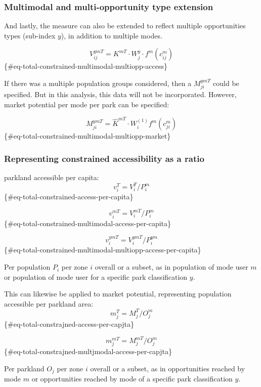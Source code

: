 \documentclass[
11pt, %
oneside, %
english, %
singlespacing, %
]{macthesis} %
\begin{document}
\subsubsection{Multimodal and multi-opportunity type extension}\label{multimodal-and-multi-opportunity-type-extension}

And lastly, the measure can also be extended to reflect multiple opportunities types (sub-index \(y\)), in addition to multiple modes.

\[
V^{ymT}_{ij} = K^{mT} \cdot W_j^{y} \cdot f^m(c^m_{ij})
\]\{\#eq-total-constrained-multimodal-multiopp-access\}

If there was a multiple population groups considered, then a \(M^{ymT}_{ji}\) could be specified. But in this analysis, this data will not be incorporated. However, market potential per mode per park can be specified:

\[
M^{ymT}_{ji} = \hat K^{mT} \cdot W_i^{(1)} f^m(c^m_{ji})
\] \{\#eq-total-constrained-multimodal-multiopp-market\}

\subsubsection{Representing constrained accessibility as a ratio}\label{representing-constrained-accessibility-as-a-ratio}

parkland accessible per capita:
\[
v^{T}_{i} = V^{T}_{i} /P_{i}^{m}
\]\{\#eq-total-constrained-access-per-capita\}

\[
v^{mT}_{i} = V^{mT}_{i} /P_{i}^{m}
\]\{\#eq-total-constrained-multimodal-access-per-capita\}

\[
v^{ymT}_{i} = V^{ymT}_{i} /P_{i}^{ym}
\]\{\#eq-total-constrained-multimodal-multiopp-access-per-capita\}

Per population \(P_i\) per zone \(i\) overall or a subset, as in population of mode user \(m\) or population of mode user for a specific park classification \(y\).

This can likewise be applied to market potential, representing population accessible per parkland area:
\[
m^{T}_{j} = M^{T}_{j} /O_{j}^{m}
\]\{\#eq-total-constrajned-access-per-capjta\}

\[
m^{mT}_{j} = M^{mT}_{j} /O_{j}^{m}
\]\{\#eq-total-constrajned-multjmodal-access-per-capjta\}

Per parkland \(O_j\) per zone \(i\) overall or a subset, as in opportunities reached by mode \(m\) or opportunities reached by mode of a specific park classification \(y\).
\end{document}
